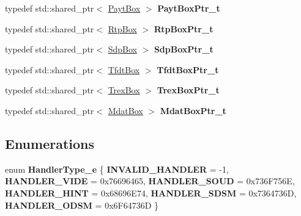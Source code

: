 \begin{DoxyCompactItemize}
typedef std\+::shared\+\_\+ptr$<$ \mbox{\hyperlink{classmp4_parser_1_1_payt_box}{Payt\+Box}} $>$ {\bfseries Payt\+Box\+Ptr\+\_\+t}
\item 
\mbox{\label{namespacemp4_parser_aeb8f4ca7e6f7578d10484d4c4fd58cc6}} 
typedef std\+::shared\+\_\+ptr$<$ \mbox{\hyperlink{classmp4_parser_1_1_rtp_box}{Rtp\+Box}} $>$ {\bfseries Rtp\+Box\+Ptr\+\_\+t}
\item 
\mbox{\label{namespacemp4_parser_a23164badff852669bf7c2838a07c0deb}} 
typedef std\+::shared\+\_\+ptr$<$ \mbox{\hyperlink{classmp4_parser_1_1_sdp_box}{Sdp\+Box}} $>$ {\bfseries Sdp\+Box\+Ptr\+\_\+t}
\item 
\mbox{\label{namespacemp4_parser_a7478ca8151d6136b3bf40f62e3ee06bf}} 
typedef std\+::shared\+\_\+ptr$<$ \mbox{\hyperlink{classmp4_parser_1_1_tfdt_box}{Tfdt\+Box}} $>$ {\bfseries Tfdt\+Box\+Ptr\+\_\+t}
\item 
\mbox{\label{namespacemp4_parser_adc2424917ba328dae922b500a5ad554d}} 
typedef std\+::shared\+\_\+ptr$<$ \mbox{\hyperlink{classmp4_parser_1_1_trex_box}{Trex\+Box}} $>$ {\bfseries Trex\+Box\+Ptr\+\_\+t}
\item 
\mbox{\label{namespacemp4_parser_a0bb701c385b7fc2cfc2414fdad551fc5}} 
typedef std\+::shared\+\_\+ptr$<$ \mbox{\hyperlink{classmp4_parser_1_1_mdat_box}{Mdat\+Box}} $>$ {\bfseries Mdat\+Box\+Ptr\+\_\+t}
\end{DoxyCompactItemize}
\subsection*{Enumerations}
\begin{DoxyCompactItemize}
\item 
\mbox{\label{namespacemp4_parser_a57a40fd5fc960e13f1d8d2b65433f295}} 
enum {\bfseries Handler\+Type\+\_\+e} \{ \newline
{\bfseries I\+N\+V\+A\+L\+I\+D\+\_\+\+H\+A\+N\+D\+L\+ER} = -\/1, 
{\bfseries H\+A\+N\+D\+L\+E\+R\+\_\+\+V\+I\+DE} = 0x76696465, 
{\bfseries H\+A\+N\+D\+L\+E\+R\+\_\+\+S\+O\+UD} = 0x736\+F756E, 
{\bfseries H\+A\+N\+D\+L\+E\+R\+\_\+\+H\+I\+NT} = 0x68696\+E74, 
\newline
{\bfseries H\+A\+N\+D\+L\+E\+R\+\_\+\+S\+D\+SM} = 0x7364736D, 
{\bfseries H\+A\+N\+D\+L\+E\+R\+\_\+\+O\+D\+SM} = 0x6\+F64736D
 \}
\end{DoxyCompactItemize}
